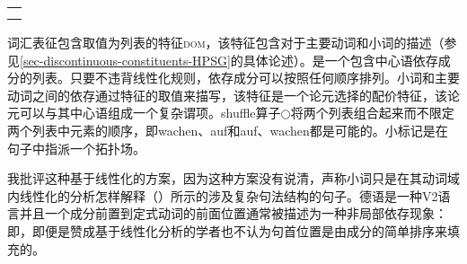 \begin{exe}
\begin{xlist}[iv.]
\begin{exe}
\begin{xlist}[iv.]
\begin{tabular}{@{}l@{}}
{{{                    }
            }\\
}
\end{tabular}
\zs
词汇表征包含取值为列表的特征\textsc{dom}，该特征包含对于主要动词和小词的描述（参见\ref{sec-discontinuous-constituents-HPSG}的具体论述）。\domlc 是一个包含中心语依存成分的列表。只要不违背线性化规则，依存成分可以按照任何顺序排列\citep{Reape94a}。小词和主要动词之间的依存通过特征\vcompc 的取值来描写，该特征是一个论元选择的配价特征，该论元可以与其中心语组成一个复杂谓项。shuffle算子$\bigcirc$将两个列表组合起来而不限定两个列表中元素的顺序，即wachen、auf和auf、wachen都是可能的。小标记是在句子中指派一个拓扑场。

我批评这种基于线性化的方案，因为这种方案没有说清，声称小词只是在其动词域内线性化的分析怎样解释（）所示的涉及复杂句法结构的句子\citep{Mueller2007d}。德语是一种V2语言并且一个成分前置到定式动词的前面位置通常被描述为一种非局部依存现象：即，即便是赞成基于线性化分析的学者也不认为句首位置是由成分的简单排序来填充的\citep{Kathol2000a,Mueller99a,Mueller2002b,TBjerre2006a}。


\end{xlist}
\end{exe}
\end{xlist}
\end{exe}
